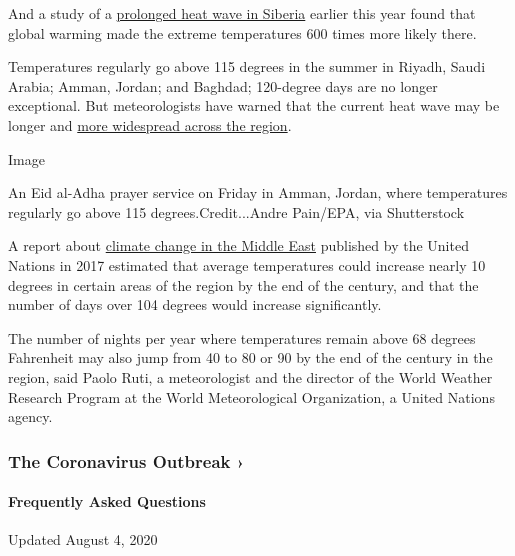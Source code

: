 And a study of a
\href{https://www.nytimes.com/2020/07/15/climate/siberia-heat-wave-climate-change.html}{prolonged
heat wave in Siberia} earlier this year found that global warming made
the extreme temperatures 600 times more likely there.

Temperatures regularly go above 115 degrees in the summer in Riyadh,
Saudi Arabia; Amman, Jordan; and Baghdad; 120-degree days are no longer
exceptional. But meteorologists have warned that the current heat wave
may be longer and
\href{https://public.wmo.int/en/media/news/above-normal-temperatures-likely-over-arab-region}{more
widespread across the region}.

Image

An Eid al-Adha prayer service on Friday in Amman, Jordan, where
temperatures regularly go above 115 degrees.Credit...Andre Pain/EPA, via
Shutterstock

A report about
\href{https://www.unescwa.org/sites/www.unescwa.org/files/events/files/riccar_main_report_2017.pdf}{climate
change in the Middle East} published by the United Nations in 2017
estimated that average temperatures could increase nearly 10 degrees in
certain areas of the region by the end of the century, and that the
number of days over 104 degrees would increase significantly.

The number of nights per year where temperatures remain above 68 degrees
Fahrenheit may also jump from 40 to 80 or 90 by the end of the century
in the region, said Paolo Ruti, a meteorologist and the director of the
World Weather Research Program at the World Meteorological Organization,
a United Nations agency.

\href{https://www.nytimes.com/news-event/coronavirus?action=click\&pgtype=Article\&state=default\&region=MAIN_CONTENT_3\&context=storylines_faq}{}

\hypertarget{the-coronavirus-outbreak-}{%
\subsubsection{The Coronavirus Outbreak
›}\label{the-coronavirus-outbreak-}}

\hypertarget{frequently-asked-questions}{%
\paragraph{Frequently Asked
Questions}\label{frequently-asked-questions}}

Updated August 4, 2020

